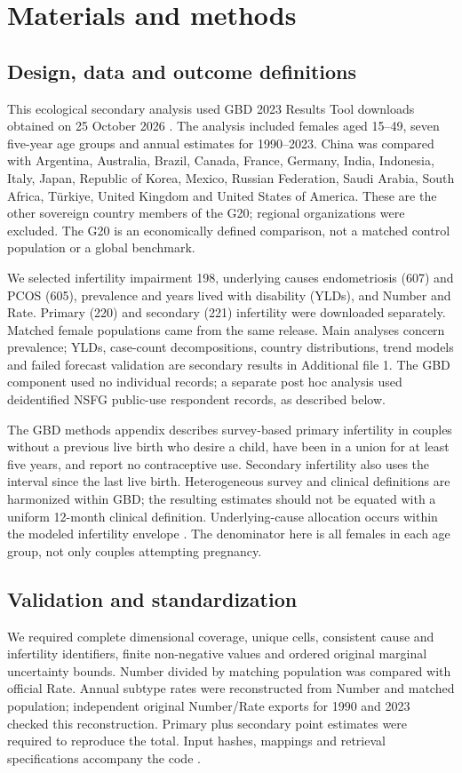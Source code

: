 \documentclass[11pt,a4paper]{article}
\begin{document}
\section{Materials and methods}
\subsection{Design, data and outcome definitions}
This ecological secondary analysis used GBD 2023 Results Tool downloads obtained on 25 October 2026 \cite{results}. The analysis included females aged 15--49, seven five-year age groups and annual estimates for 1990--2023. China was compared with Argentina, Australia, Brazil, Canada, France, Germany, India, Indonesia, Italy, Japan, Republic of Korea, Mexico, Russian Federation, Saudi Arabia, South Africa, T\"urkiye, United Kingdom and United States of America. These are the other sovereign country members of the G20; regional organizations were excluded. The G20 is an economically defined comparison, not a matched control population or a global benchmark.

We selected infertility impairment 198, underlying causes endometriosis (607) and PCOS (605), prevalence and years lived with disability (YLDs), and Number and Rate. Primary (220) and secondary (221) infertility were downloaded separately. Matched female populations came from the same release. Main analyses concern prevalence; YLDs, case-count decompositions, country distributions, trend models and failed forecast validation are secondary results in Additional file 1. The GBD component used no individual records; a separate post hoc analysis used deidentified NSFG public-use respondent records, as described below.

The GBD methods appendix describes survey-based primary infertility in couples without a previous live birth who desire a child, have been in a union for at least five years, and report no contraceptive use. Secondary infertility also uses the interval since the last live birth. Heterogeneous survey and clinical definitions are harmonized within GBD; the resulting estimates should not be equated with a uniform 12-month clinical definition. Underlying-cause allocation occurs within the modeled infertility envelope \cite{gbd}. The denominator here is all females in each age group, not only couples attempting pregnancy.

\subsection{Validation and standardization}
We required complete dimensional coverage, unique cells, consistent cause and infertility identifiers, finite non-negative values and ordered original marginal uncertainty bounds. Number divided by matching population was compared with official Rate. Annual subtype rates were reconstructed from Number and matched population; independent original Number/Rate exports for 1990 and 2023 checked this reconstruction. Primary plus secondary point estimates were required to reproduce the total. Input hashes, mappings and retrieval specifications accompany the code \cite{repository}.
\end{document}
